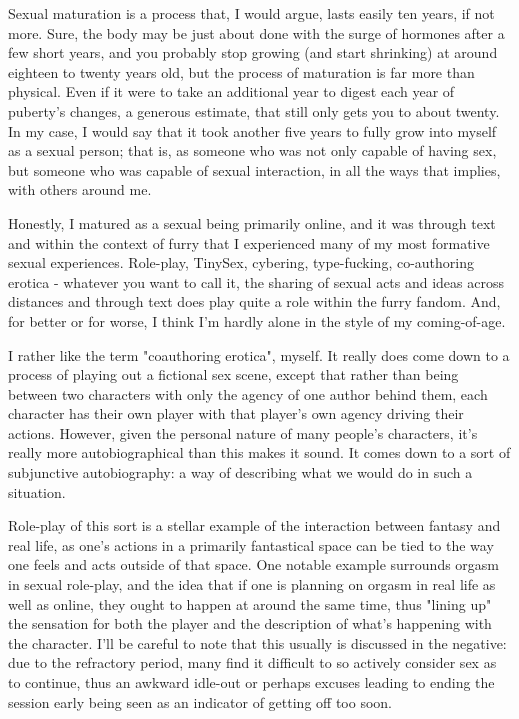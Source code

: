 
Sexual maturation is a process that, I would argue, lasts easily ten years, if not more. Sure, the body may be just about done with the surge of hormones after a few short years, and you probably stop growing (and start shrinking) at around eighteen to twenty years old, but the process of maturation is far more than physical. Even if it were to take an additional year to digest each year of puberty's changes, a generous estimate, that still only gets you to about twenty. In my case, I would say that it took another five years to fully grow into myself as a sexual person; that is, as someone who was not only capable of having sex, but someone who was capable of sexual interaction, in all the ways that implies, with others around me.

Honestly, I matured as a sexual being primarily online, and it was through text and within the context of furry that I experienced many of my most formative sexual experiences. Role-play, TinySex, cybering, type-fucking, co-authoring erotica - whatever you want to call it, the sharing of sexual acts and ideas across distances and through text does play quite a role within the furry fandom. And, for better or for worse, I think I'm hardly alone in the style of my coming-of-age.

I rather like the term "coauthoring erotica", myself. It really does come down to a process of playing out a fictional sex scene, except that rather than being between two characters with only the agency of one author behind them, each character has their own player with that player's own agency driving their actions. However, given the personal nature of many people's characters, it's really more autobiographical than this makes it sound. It comes down to a sort of subjunctive autobiography: a way of describing what we would do in such a situation.

Role-play of this sort is a stellar example of the interaction between fantasy and real life, as one's actions in a primarily fantastical space can be tied to the way one feels and acts outside of that space. One notable example surrounds orgasm in sexual role-play, and the idea that if one is planning on orgasm in real life as well as online, they ought to happen at around the same time, thus "lining up" the sensation for both the player and the description of what's happening with the character. I'll be careful to note that this usually is discussed in the negative: due to the refractory period, many find it difficult to so actively consider sex as to continue, thus an awkward idle-out or perhaps excuses leading to ending the session early being seen as an indicator of getting off too soon.

